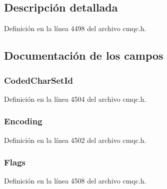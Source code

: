 \subsection{Descripción detallada}


Definición en la línea 4498 del archivo cmqc.\+h.



\subsection{Documentación de los campos}
\hypertarget{structtag_m_q_m_d_e_a4d8d1961a991850d1355cdf9b4680b8e}{}
\subsubsection[{Coded\+Char\+Set\+Id}]{ Coded\+Char\+Set\+Id}\label{structtag_m_q_m_d_e_a4d8d1961a991850d1355cdf9b4680b8e}


Definición en la línea 4504 del archivo cmqc.\+h.

\hypertarget{structtag_m_q_m_d_e_a30167bf454a49a60fd3fe4e9e586af34}{}
\subsubsection[{Encoding}]{ Encoding}\label{structtag_m_q_m_d_e_a30167bf454a49a60fd3fe4e9e586af34}


Definición en la línea 4502 del archivo cmqc.\+h.

\hypertarget{structtag_m_q_m_d_e_a8da770267273b200fa9c968fa2a0da57}{}
\subsubsection[{Flags}]{ Flags}\label{structtag_m_q_m_d_e_a8da770267273b200fa9c968fa2a0da57}


Definición en la línea 4508 del archivo cmqc.\+h.

\hypertarget{structtag_m_q_m_d_e_a435a478822008713f8aaff89f369ed63}{}
